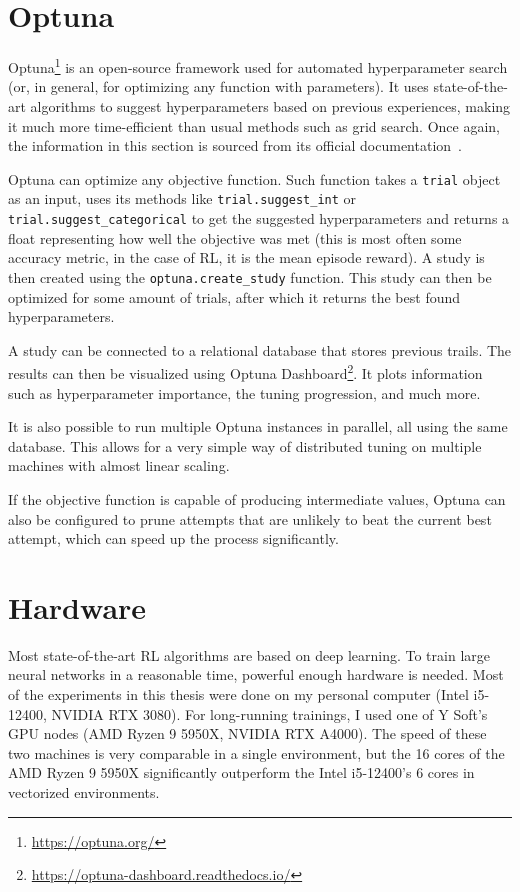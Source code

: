 \documentclass[
  digital,     %
  oneside,     %
  nosansbold,  %
  nocolorbold, %
  lof,         %
  lot,         %
]{fithesis4}
\begin{document}
\section{Optuna}

Optuna\footnote{\url{https://optuna.org/}} is an open-source framework used for automated hyperparameter search (or, in general, for optimizing any function with parameters). It uses state-of-the-art algorithms to suggest hyperparameters based on previous experiences, making it much more time-efficient than usual methods such as grid search. Once again, the information in this section is sourced from its official documentation~\cite{optuna-docs}.

Optuna can optimize any objective function. Such function takes a \texttt{trial} object as an input, uses its methods like \texttt{trial.suggest\_int} or \texttt{trial.suggest\_categorical} to get the suggested hyperparameters and returns a float representing how well the objective was met (this is most often some accuracy metric, in the case of RL, it is the mean episode reward). A study is then created using the \texttt{optuna.create\_study} function. This study can then be optimized for some amount of trials, after which it returns the best found hyperparameters.

A study can be connected to a relational database that stores previous trails. The results can then be visualized using Optuna Dashboard\footnote{\url{https://optuna-dashboard.readthedocs.io/}}. It plots information such as hyperparameter importance, the tuning progression, and much more.

It is also possible to run multiple Optuna instances in parallel, all using the same database. This allows for a very simple way of distributed tuning on multiple machines with almost linear scaling.

If the objective function is capable of producing intermediate values, Optuna can also be configured to prune attempts that are unlikely to beat the current best attempt, which can speed up the process significantly.

\section{Hardware}

Most state-of-the-art RL algorithms are based on deep learning. To train large neural networks in a reasonable time, powerful enough hardware is needed. Most of the experiments in this thesis were done on my personal computer (Intel i5-12400, NVIDIA RTX 3080). For long-running trainings, I used one of Y Soft's GPU nodes (AMD Ryzen 9 5950X, NVIDIA RTX A4000). The speed of these two machines is very comparable in a single environment, but the 16 cores of the AMD Ryzen 9 5950X significantly outperform the Intel i5-12400's 6 cores in vectorized environments.
\end{document}
